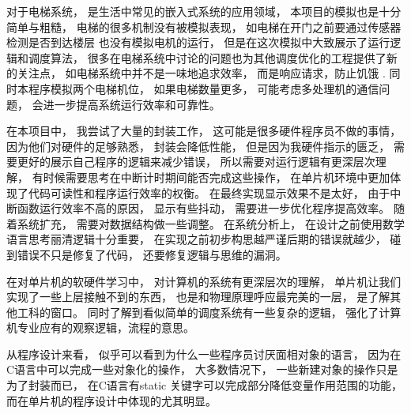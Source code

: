 \documentclass[../main.tex]{subfiles} %
\begin{document}
对于电梯系统，
是生活中常见的嵌入式系统的应用领域，
本项目的模拟也是十分简单与粗糙，
电梯的很多机制没有被模拟表现，
如电梯在开门之前要通过传感器检测是否到达楼层
也没有模拟电机的运行，
但是在这次模拟中大致展示了运行逻辑和调度算法，
很多在电梯系统中讨论的问题也为其他调度优化的工程提供了新的关注点，
如电梯系统中并不是一味地追求效率，
而是响应请求，防止饥饿
.
同时本程序模拟两个电梯机位，
如果电梯数量更多，
可能考虑多处理机的通信问题，
会进一步提高系统运行效率和可靠性。


在本项目中，
我尝试了大量的封装工作，
这可能是很多硬件程序员不做的事情，
因为他们对硬件的足够熟悉，
封装会降低性能，
但是因为我硬件指示的匮乏，
需要更好的展示自己程序的逻辑来减少错误，
所以需要对运行逻辑有更深层次理解，
有时候需要思考在中断计时期间能否完成这些操作，
在单片机环境中更加体现了代码可读性和程序运行效率的权衡。
在最终实现显示效果不是太好，
由于中断函数运行效率不高的原因，
显示有些抖动，
需要进一步优化程序提高效率。
随着系统扩充，
需要对数据结构做一些调整。
在系统分析上，
在设计之前使用数学语言思考丽清逻辑十分重要，
在实现之前初步构思越严谨后期的错误就越少，
碰到错误不只是修复了代码，
还要修复逻辑与思维的漏洞。

在对单片机的软硬件学习中，
对计算机的系统有更深层次的理解，
单片机让我们实现了一些上层接触不到的东西，
也是和物理原理呼应最完美的一层，
是了解其他工科的窗口。
同时了解到看似简单的调度系统有一些复杂的逻辑，
强化了计算机专业应有的观察逻辑，流程的意思。


从程序设计来看，
似乎可以看到为什么一些程序员讨厌面相对象的语言，
因为在C语言中可以完成一些对象化的操作，
大多数情况下，
一些新建对象的操作只是为了封装而已，
在C语言有static 关键字可以完成部分降低变量作用范围的功能，
而在单片机的程序设计中体现的尤其明显。
\end{document}
